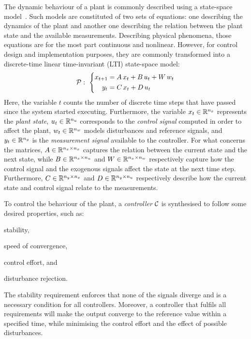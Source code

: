 The dynamic behaviour of a plant is commonly described using a state-space model~\cite{Astrom:2008}. 
Such models are constituted of two sets of equations: one describing the dynamics of the plant and another one describing the relation between the plant state and the available measurements. 
Describing physical phenomena, those equations are for the most part continuous and nonlinear. 
However, for control design and implementation purposes, they are commonly transformed into a discrete-time linear time-invariant (LTI) state-space model:
\begin{equation}
    \label{eq:plant}
    \plant: \,\, \left\{
    \begin{aligned}
        x_{t+1} &= \Ap\,x_t + \Bp\,u_t + \Wp\,w_t \\
        y_t &= \Cp\,x_t + \Dp\,u_t 
    \end{aligned}
    \right.
\end{equation}
Here, the variable $t$ counts the number of discrete time steps that have passed since the system started executing. 
Furthermore, the variable $x_t \in \mathbb{R}^{n_x}$ represents the \emph{plant state}, $u_t \in \mathbb{R}^{n_u}$ corresponds to the \emph{control signal} computed in order to affect the plant, $w_t \in \mathbb{R}^{n_w}$ models disturbances and reference signals, and $y_t \in \mathbb{R}^{n_y}$ is the \emph{measurement signal} available to the controller. 
For what concerns the matrices, $A \in \mathbb{R}^{n_x \times n_x}$ captures the relation between the current state and the next state, while $B \in \mathbb{R}^{n_x \times n_u}$ and $W \in \mathbb{R}^{n_x \times n_w}$ respectively capture how the control signal and the exogenous signals affect the state at the next time step.
Furthermore, $C \in \mathbb{R}^{n_y \times n_x}$ and $D \in \mathbb{R}^{n_y \times n_u}$ respectively describe how the current state and control signal relate to the measurements.

To control the behaviour of the plant, a \emph{controller} $\mathcal{C}$ is synthesised to follow some desired properties, such as: 
\begin{enumerate*}[label=(\roman*)]
    \item stability, 
    \item speed of convergence, 
    \item control effort, and 
    \item disturbance rejection.
\end{enumerate*}
The stability requirement enforces that none of the signals diverge and is a necessary condition for all controllers.
Moreover, a controller that fulfils all requirements will make the output converge to the reference value within a specified time, while minimising the control effort and the effect of possible disturbances.

